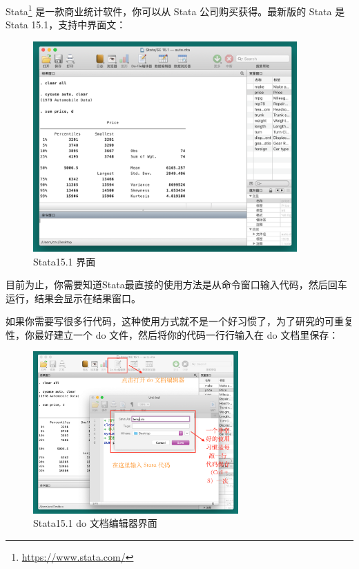 \documentclass[]{ctexbook}
\renewcommand{\href}[2]{#2\footnote{\url{#1}}}
\begin{document}
\href{https://www.stata.com/}{Stata} 是一款商业统计软件，你可以从 Stata 公司购买获得。最新版的 Stata 是 Stata 15.1，支持中界面文：

\begin{figure}

{\centering \includegraphics[width=0.9\textwidth]{assets/stataui} 

}

\caption{Stata15.1 界面}\label{fig:stataui}
\end{figure}

目前为止，你需要知道Stata最直接的使用方法是从命令窗口输入代码，然后回车运行，结果会显示在结果窗口。

如果你需要写很多行代码，这种使用方式就不是一个好习惯了，为了研究的可重复性，你最好建立一个 do 文件，然后将你的代码一行行输入在 do 文档里保存：

\begin{figure}

{\centering \includegraphics[width=0.7\textwidth]{assets/do-file} 

}

\caption{Stata15.1 do 文档编辑器界面}\label{fig:dofile}
\end{figure}
\end{document}
